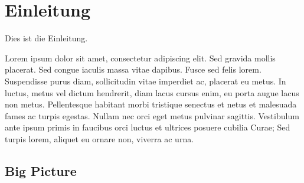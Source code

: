 \chapter{Einleitung}

Dies ist die Einleitung.

Lorem ipsum dolor sit amet, consectetur adipiscing elit. Sed gravida mollis placerat. Sed congue iaculis massa vitae dapibus. Fusce sed felis lorem. Suspendisse purus diam, sollicitudin vitae imperdiet ac, placerat eu metus. In luctus, metus vel dictum hendrerit, diam lacus cursus enim, eu porta augue lacus non metus. Pellentesque habitant morbi tristique senectus et netus et malesuada fames ac turpis egestas. Nullam nec orci eget metus pulvinar sagittis. Vestibulum ante ipsum primis in faucibus orci luctus et ultrices posuere cubilia Curae; Sed turpis lorem, aliquet eu ornare non, viverra ac urna.

\section{Big Picture}

